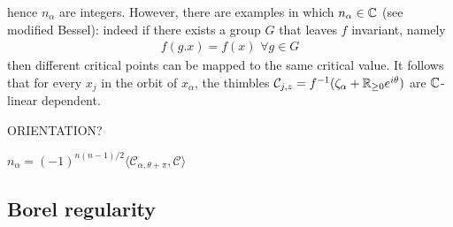 \documentclass[11pt,a4paper,twoside,leqno,noamsfonts]{amsart}
\numberwithin{equation}{section}
\begin{document}
hence $n_\alpha$ are integers. However, there are examples in which $n_\alpha\in\mathbb C$ (see modified Bessel): indeed if there exists a group $G$ that leaves $f$ invariant, namely
\begin{align*}
f(g.x)=f(x)\,\,\forall g\in G
\end{align*} 
then different critical points can be mapped to the same critical value. It follows that for every $x_j$ in the orbit of $x_\alpha$, the thimbles $\mathcal{C}_{j,z}=f^{-1}(\zeta_\alpha+ \mathbb R_{\geq 0} e^{i\theta})$ are $\mathbb C$-linear dependent.
 


\color{magenta}
ORIENTATION? 

$n_\alpha=(-1)^{n(n-1)/2}\langle \mathcal{C}_{\alpha,\theta+\pi},\mathcal{C}\rangle$ 

\color{black}

\subsection{Borel regularity}
\end{document}
